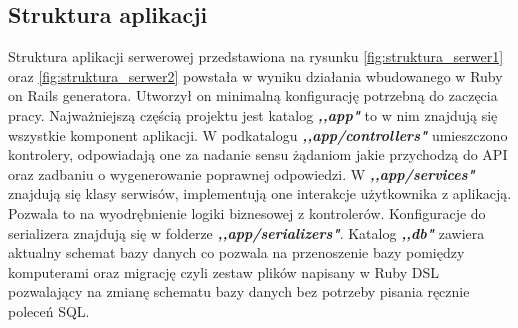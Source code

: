\documentclass[declaration,shortabstract]{iithesis}
\begin{document}
\subsection{Struktura aplikacji}
Struktura aplikacji serwerowej przedstawiona na rysunku \ref{fig:struktura_serwer1} oraz \ref{fig:struktura_serwer2} powstała w wyniku działania wbudowanego w Ruby on Rails generatora. Utworzył on minimalną konfigurację potrzebną do zaczęcia pracy. Najważniejszą częścią projektu jest katalog \textbf{\textit{,,app"}} to w nim znajdują się wszystkie komponent aplikacji. W podkatalogu \textbf{\textit{,,app/controllers"}} umieszczono kontrolery, odpowiadają one za nadanie sensu żądaniom jakie przychodzą do API oraz zadbaniu o wygenerowanie poprawnej odpowiedzi. W \textbf{\textit{,,app/services"}} znajdują się klasy serwisów, implementują one interakcje użytkownika z aplikacją. Pozwala to na wyodrębnienie logiki biznesowej z kontrolerów. Konfiguracje do serializera znajdują się w folderze \textbf{\textit{,,app/serializers"}}. Katalog \textbf{\textit{,,db"}} zawiera aktualny schemat bazy danych co pozwala na przenoszenie bazy pomiędzy komputerami oraz migrację czyli zestaw plików napisany w Ruby DSL pozwalający na zmianę schematu bazy danych bez potrzeby pisania ręcznie poleceń SQL.
\end{document}
